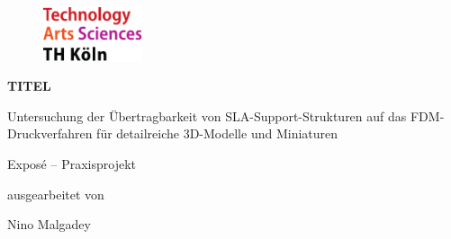 \begin{titlepage}

\begin{center}

\begin{figure}[!ht]
		\includegraphics[width=0.26\textwidth]{images/THlogoheader.pdf}
\end{figure}

\vspace{0.4cm}

\begin{rmfamily}
\begin{huge}
\textbf{TITEL}\\	
\end{huge}
\begin{LARGE}
	Untersuchung der Übertragbarkeit von SLA-Support-Strukturen auf das FDM-Druckverfahren für detailreiche 3D-Modelle und Miniaturen\\
\end{LARGE}
\vspace{0.5cm}
\end{rmfamily}

\vspace{0.8cm}



\begin{LARGE}
\begin{scshape}
Exposé – Praxisprojekt\\[0.8em]
\end{scshape}
\end{LARGE}

\begin{large}
ausgearbeitet von\\ 
\vspace{0.3cm}
\begin{LARGE}
Nino Malgadey\\
\end{LARGE}
\end{large}


\end{center}
\end{titlepage}
